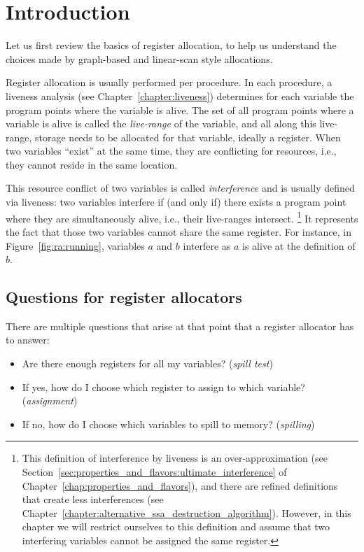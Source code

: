 {\section{Introduction}

Let us first review the basics of register allocation, to help us understand the choices made by graph-based and linear-scan style allocations.

Register allocation is usually performed per procedure. 
In each procedure, a liveness analysis (see Chapter~\ref{chapter:liveness}) determines for each variable the program points where the variable is alive. 
The set of all program points where a variable is alive is called the \emph{live-range} of the variable, and all along this live-range, storage needs to be allocated for that variable, ideally a register. When two variables ``exist'' at the same time, they are conflicting for resources, i.e., they cannot reside in the same location.

This resource conflict of two variables is called \emph{interference} and is usually defined via liveness: 
two variables interfere if (and only if) there exists a program point where they are simultaneously alive, i.e., their live-ranges intersect.%
\footnote{ This definition of interference by liveness is an over-approximation (see Section~\ref{sec:properties_and_flavors:ultimate_interference} of Chapter~\ref{chap:properties_and_flavors}), and there are refined definitions that create less interferences (see Chapter~\ref{chapter:alternative_ssa_destruction_algorithm}). 
  However, in this chapter we will restrict ourselves to this definition and assume that two interfering variables cannot be assigned the same register. 
}
It represents the fact that those two variables cannot share the same register.
For instance, in Figure~\ref{fig:ra:running}, variables $a$ and $b$ interfere 
as $a$ is alive at the definition of $b$.

\subsection{Questions for register allocators}

There are multiple questions that arise at that point that a register allocator has to answer:
\begin{itemize}
  \item Are there enough registers for all my variables? (\emph{spill test})
  \item If yes, how do I choose which register to assign to which variable? (\emph{assignment})
  \item If no, how do I choose which variables to spill to memory? (\emph{spilling})
\end{itemize}

}
